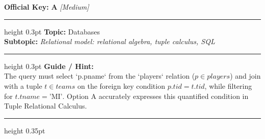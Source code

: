 \documentclass[a4paper,10pt]{article}
\begin{document}
\begin{tcolorbox}
\textbf{Official Key:} \textbf{\large A} \hfill \textit{\small [Medium]}
\vspace{2pt}\hrule height 0.3pt\vspace{3pt}
\textbf{Topic:} Databases \\
\textbf{Subtopic:} \textit{Relational model: relational algebra, tuple calculus, SQL}
\vspace{2pt}\hrule height 0.3pt\vspace{3pt}
\textbf{Guide / Hint:} \\
{\small The query must select `p.pname` from the `players` relation ($p \in players$) and join with a tuple $t \in teams$ on the foreign key condition $p.tid = t.tid$, while filtering for $t.tname = \text{'MI'}$. Option A accurately expresses this quantified condition in Tuple Relational Calculus.}

\end{tcolorbox}
\vspace{6pt}\hrule height 0.35pt\vspace{6pt}
\vspace{8pt}
\end{document}
